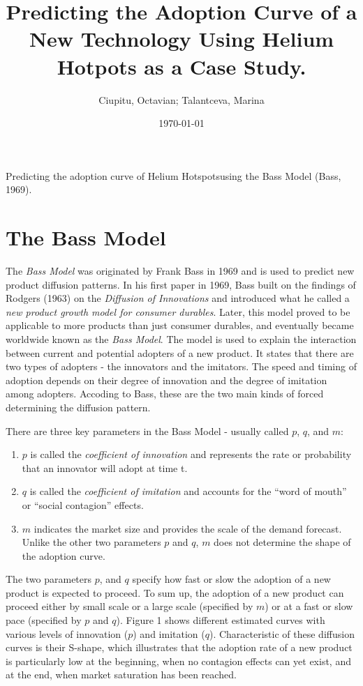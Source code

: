\documentclass{article}
\title{Predicting the Adoption Curve of a New Technology Using Helium Hotpots as a Case Study.}
\author{Ciupitu, Octavian; Talantceva, Marina}
\begin{document}
\date{\today}
\maketitle

\begin{center}
    Predicting the adoption curve of Helium Hotspotsusing the Bass Model (Bass, 1969).
\end{center}
  

\section{The Bass Model}

The \emph{Bass Model} was originated by Frank Bass in 1969 and is used to predict new product diffusion patterns. In his first paper
in 1969, Bass built on the findings of Rodgers (1963) on the \emph{Diffusion of Innovations} and introduced what he called a
\emph{new product growth model for consumer durables}. Later, this model proved to be applicable to more products than just consumer
durables, and eventually became worldwide known as the \emph{Bass Model}. The model is used to explain the interaction between current
and potential adopters of a new product. It states that there are two types of adopters - the innovators and the imitators. The speed
and timing of adoption depends on their degree of innovation and the degree of imitation among adopters. Accoding to Bass, these are the
two main kinds of forced determining the diffusion pattern.

\medskip

\noindent There are three key parameters in the Bass Model - usually called $p$, $q$, and $m$:

\begin{enumerate}
    \item $p$ is called the \emph{coefficient of innovation} and represents the rate or probability that an innovator will adopt at time t. 
    \item $q$ is called the \emph{coefficient of imitation} and accounts for the “word of mouth” or “social contagion” effects.
    \item $m$ indicates the market size and provides the scale of the demand forecast. Unlike the other two parameters $p$ and $q$,
    $m$ does not determine the shape of the adoption curve. 
\end{enumerate}

\noindent The two parameters $p$, and $q$ specify how fast or slow the adoption of a new product is expected to proceed. To sum up, the adoption of a
new product can proceed either by small scale or a large scale (specified by $m$) or at a fast or slow pace (specified by $p$ and $q$). 
Figure 1 shows different estimated curves with various levels of innovation ($p$) and imitation ($q$). Characteristic of these diffusion curves is
their S-shape, which illustrates that the adoption rate of a new product is particularly low at the beginning, when no contagion effects can yet exist,
and at the end, when market saturation has been reached. 
\end{document}

